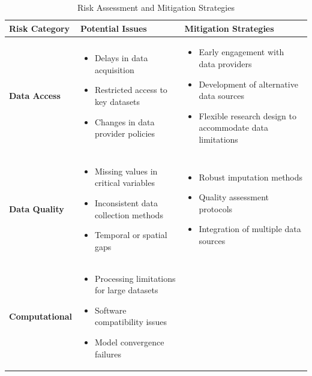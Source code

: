 \documentclass[12pt,a4paper,landscape]{article}
\begin{document}
\begin{table}[H]
    \centering
    \caption{Risk Assessment and Mitigation Strategies}
    \label{tab:risks}
    \begin{tabular}{p{3cm}p{6cm}p{6cm}}
    \toprule
    \textbf{Risk Category} & \textbf{Potential Issues} & \textbf{Mitigation Strategies} \\
    \midrule
    \textbf{Data Access} & 
    \begin{itemize}[leftmargin=*]
        \item Delays in data acquisition
        \item Restricted access to key datasets
        \item Changes in data provider policies
    \end{itemize} & 
    \begin{itemize}[leftmargin=*]
        \item Early engagement with data providers
        \item Development of alternative data sources
        \item Flexible research design to accommodate data limitations
    \end{itemize} \\
    \midrule
    \textbf{Data Quality} & 
    \begin{itemize}[leftmargin=*]
        \item Missing values in critical variables
        \item Inconsistent data collection methods
        \item Temporal or spatial gaps
    \end{itemize} & 
    \begin{itemize}[leftmargin=*]
        \item Robust imputation methods
        \item Quality assessment protocols
        \item Integration of multiple data sources
    \end{itemize} \\
    \midrule
    \textbf{Computational} & 
    \begin{itemize}[leftmargin=*]
        \item Processing limitations for large datasets
        \item Software compatibility issues
        \item Model convergence failures
    \end{itemize} & 
    \begin{itemize}[leftmargin=*]

\end{itemize}
\end{tabular}
\end{table}
\end{document}
